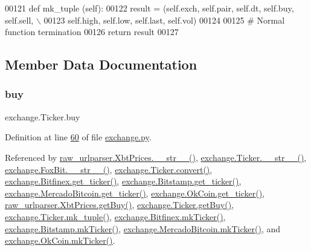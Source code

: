 \begin{DoxyCode}
00121     \textcolor{keyword}{def }mk\_tuple (self): 
00122         result = (self.exch, self.pair, self.dt, self.buy, self.sell, \(\backslash\)
00123             self.high, self.low, self.last, self.vol)
00124             
00125         \textcolor{comment}{# Normal function termination }
00126         \textcolor{keywordflow}{return} result
00127         
\end{DoxyCode}


\subsection{Member Data Documentation}
\mbox{\label{classexchange_1_1_ticker_a2ca48c3fa9aba92241392a05bef39324}} 
\subsubsection{\texorpdfstring{buy}{buy}}
{\footnotesize\ttfamily exchange.\+Ticker.\+buy}



Definition at line \hyperlink{exchange_8py_source_l00060}{60} of file \hyperlink{exchange_8py_source}{exchange.\+py}.



Referenced by \hyperlink{raw__urlparser_8py_source_l00074}{raw\+\_\+urlparser.\+Xbt\+Prices.\+\_\+\+\_\+str\+\_\+\+\_\+()}, \hyperlink{exchange_8py_source_l00136}{exchange.\+Ticker.\+\_\+\+\_\+str\+\_\+\+\_\+()}, \hyperlink{exchange_8py_source_l00610}{exchange.\+Fox\+Bit.\+\_\+\+\_\+str\+\_\+\+\_\+()}, \hyperlink{exchange_8py_source_l00069}{exchange.\+Ticker.\+convert()}, \hyperlink{exchange_8py_source_l00439}{exchange.\+Bitfinex.\+get\+\_\+ticker()}, \hyperlink{exchange_8py_source_l00511}{exchange.\+Bitstamp.\+get\+\_\+ticker()}, \hyperlink{exchange_8py_source_l00651}{exchange.\+Mercado\+Bitcoin.\+get\+\_\+ticker()}, \hyperlink{exchange_8py_source_l00716}{exchange.\+Ok\+Coin.\+get\+\_\+ticker()}, \hyperlink{raw__urlparser_8py_source_l00062}{raw\+\_\+urlparser.\+Xbt\+Prices.\+get\+Buy()}, \hyperlink{exchange_8py_source_l00100}{exchange.\+Ticker.\+get\+Buy()}, \hyperlink{exchange_8py_source_l00121}{exchange.\+Ticker.\+mk\+\_\+tuple()}, \hyperlink{exchange_8py_source_l00453}{exchange.\+Bitfinex.\+mk\+Ticker()}, \hyperlink{exchange_8py_source_l00525}{exchange.\+Bitstamp.\+mk\+Ticker()}, \hyperlink{exchange_8py_source_l00665}{exchange.\+Mercado\+Bitcoin.\+mk\+Ticker()}, and \hyperlink{exchange_8py_source_l00730}{exchange.\+Ok\+Coin.\+mk\+Ticker()}.

